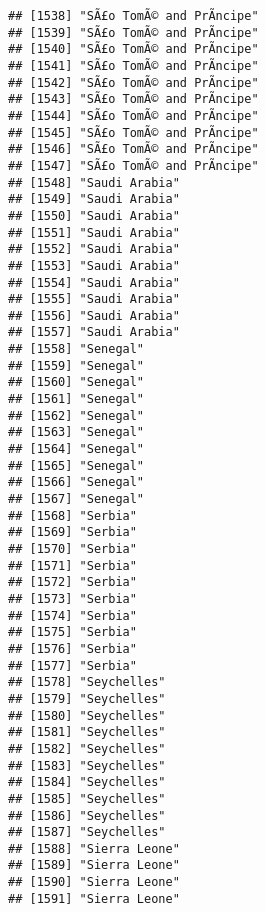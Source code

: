 \documentclass[]{article}
\begin{document}
\begin{verbatim}
## [1538] "SÃ£o TomÃ© and PrÃ­ncipe"              
## [1539] "SÃ£o TomÃ© and PrÃ­ncipe"              
## [1540] "SÃ£o TomÃ© and PrÃ­ncipe"              
## [1541] "SÃ£o TomÃ© and PrÃ­ncipe"              
## [1542] "SÃ£o TomÃ© and PrÃ­ncipe"              
## [1543] "SÃ£o TomÃ© and PrÃ­ncipe"              
## [1544] "SÃ£o TomÃ© and PrÃ­ncipe"              
## [1545] "SÃ£o TomÃ© and PrÃ­ncipe"              
## [1546] "SÃ£o TomÃ© and PrÃ­ncipe"              
## [1547] "SÃ£o TomÃ© and PrÃ­ncipe"              
## [1548] "Saudi Arabia"                       
## [1549] "Saudi Arabia"                       
## [1550] "Saudi Arabia"                       
## [1551] "Saudi Arabia"                       
## [1552] "Saudi Arabia"                       
## [1553] "Saudi Arabia"                       
## [1554] "Saudi Arabia"                       
## [1555] "Saudi Arabia"                       
## [1556] "Saudi Arabia"                       
## [1557] "Saudi Arabia"                       
## [1558] "Senegal"                            
## [1559] "Senegal"                            
## [1560] "Senegal"                            
## [1561] "Senegal"                            
## [1562] "Senegal"                            
## [1563] "Senegal"                            
## [1564] "Senegal"                            
## [1565] "Senegal"                            
## [1566] "Senegal"                            
## [1567] "Senegal"                            
## [1568] "Serbia"                             
## [1569] "Serbia"                             
## [1570] "Serbia"                             
## [1571] "Serbia"                             
## [1572] "Serbia"                             
## [1573] "Serbia"                             
## [1574] "Serbia"                             
## [1575] "Serbia"                             
## [1576] "Serbia"                             
## [1577] "Serbia"                             
## [1578] "Seychelles"                         
## [1579] "Seychelles"                         
## [1580] "Seychelles"                         
## [1581] "Seychelles"                         
## [1582] "Seychelles"                         
## [1583] "Seychelles"                         
## [1584] "Seychelles"                         
## [1585] "Seychelles"                         
## [1586] "Seychelles"                         
## [1587] "Seychelles"                         
## [1588] "Sierra Leone"                       
## [1589] "Sierra Leone"                       
## [1590] "Sierra Leone"                       
## [1591] "Sierra Leone"                       

\end{verbatim}
\end{document}
